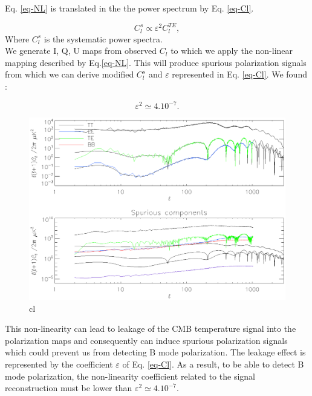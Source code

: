 
Eq. \ref{eq-NL} is translated in the the power spectrum by Eq. \ref{eq-Cl}.

\begin{equation}
C_{l}^{s} \propto \varepsilon^{2} C_{l}^{TE},
\label{eq-Cl}
\end{equation}
Where $C_{l}^{s}$ is the systematic power spectra.\\

We generate I, Q, U maps from observed $C_{l}$ to which we apply the non-linear mapping described by Eq.\ref{eq-NL}. This will produce spurious polarization signals from which we can derive modified $C_{l}^{s}$ and $\varepsilon$ represented in Eq. \ref{eq-Cl}. We found :

\begin{equation}
\varepsilon^{2} \simeq 4.10^{-7}.
\label{epsilon}
\end{equation}

\begin{figure}[h]
\center
	\includegraphics[scale=0.55]{Figures/cl.eps}
	\caption{cl}
	\label{fig:cl}
\end{figure}

This non-linearity can lead to leakage of the CMB temperature signal into the polarization maps and consequently can induce spurious polarization signals which could prevent us from detecting B mode polarization. The leakage effect is represented by the coefficient $\varepsilon$ of Eq. \ref{eq-Cl}. As a result, to be able to detect B mode polarization, the non-linearity coefficient related to the signal reconstruction must be lower than $\varepsilon^{2} \simeq 4.10^{-7}$.

